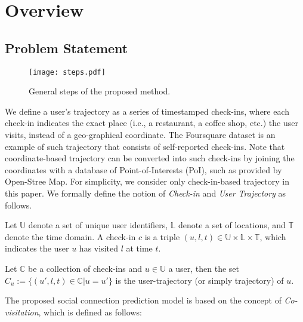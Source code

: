 \section{Overview} \label{sec:overview}

\subsection{Problem Statement} \label{sec:problem}



\begin{figure*}[ht]
\begin{center}
\texttt{[image: steps.pdf]}
\end{center}
\caption{General steps of the proposed method. }\label{steps}
\end{figure*}


We define a user's trajectory as a series of timestamped check-ins, where each check-in indicates the exact place (i.e., a restaurant, a coffee shop, etc.) the user visits, instead of a geo-graphical coordinate. The Foursquare dataset is an example of such trajectory that consists of self-reported check-ins. Note that coordinate-based trajectory can be converted into such check-ins by joining the coordinates with a database of Point-of-Interests (PoI), such as provided by Open-Stree Map. For simplicity, we consider only check-in-based trajectory in this paper. We formally define the notion of \textit{Check-in} and \textit{User Trajectory} as follows.

\begin{definition}[Check-in]
Let $\mathbb{U}$ denote a set of unique user identifiers, $\mathbb{L}$ denote a set of locations, and $\mathbb{T}$ denote the time domain. A check-in $c$ is a triple $(u, l, t) \in \mathbb{U} \times \mathbb{L} \times \mathbb{T}$, which indicates the user $u$ has visited $l$ at time $t$.
\end{definition}

\begin{definition}
Let $\mathbb{C}$ be a collection of check-ins and $u \in \mathbb{U}$ a user, then the set $C_u := \{ (u', l, t) \in \mathbb{C} | u = u'\}$ is the user-trajectory (or simply trajectory) of $u$.
\end{definition}

The proposed social connection prediction model is based on the concept of \textit{Co-visitation}, which is defined as follows: 

